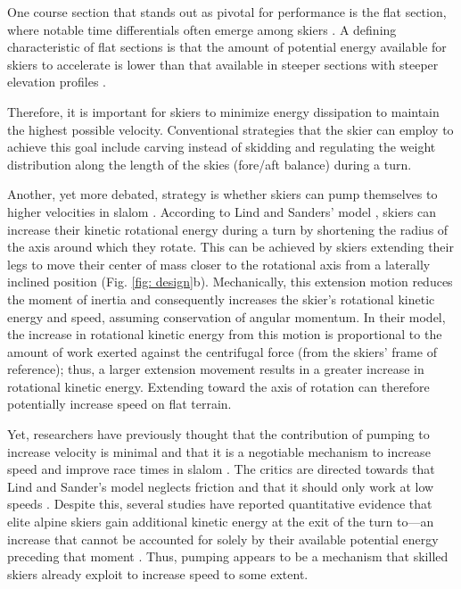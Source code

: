 \documentclass{article}
\begin{document}
One course section that stands out as pivotal for performance is the flat section\cite{supej_new_2011, supej_relations_2006}, where notable time differentials often emerge among skiers \cite{supej_impact_2015}. A defining characteristic of flat sections is that the amount of potential energy available for skiers to accelerate is lower than that available in steeper sections with steeper elevation profiles \cite{supej_differential_2008}. 

Therefore, it is important for skiers to minimize energy dissipation to maintain the highest possible velocity. Conventional strategies that the skier can employ to achieve this goal include carving instead of skidding and regulating the weight distribution along the length of the skies (fore/aft balance) during a turn\cite{reid_turn_2009, reid_kinematic_2010,supej_impact_2015, supej_differential_2008}.

Another, yet more debated, strategy is whether skiers can pump themselves to higher velocities in slalom \cite{lind_physics_2013, luginbuhl_identification_2023, mote_accelerations_1983}. According to Lind and Sanders' model \cite{lind_physics_2013}, skiers can increase their kinetic rotational energy during a turn by shortening the radius of the axis around which they rotate. This can be achieved by skiers extending their legs to move their center of mass closer to the rotational axis from a laterally inclined position (Fig. \ref{fig: design}b). Mechanically, this extension motion reduces the moment of inertia and consequently increases the skier's rotational kinetic energy and speed, assuming conservation of angular momentum. In their model, the increase in rotational kinetic energy from this motion is proportional to the amount of work exerted against the centrifugal force (from the skiers' frame of reference); thus, a larger extension movement results in a greater increase in rotational kinetic energy. Extending toward the axis of rotation can therefore potentially increase speed on flat terrain.

Yet, researchers have previously thought that the contribution of pumping to increase velocity is minimal and that it is a negotiable mechanism to increase speed and improve race times in slalom \cite{supej_differential_2008, supej_doba_2001}. The critics are directed towards that Lind and Sander's model neglects friction and that it should only work at low speeds \cite{supej_differential_2008, supej_how_2010}. Despite this, several studies have reported quantitative evidence that elite alpine skiers gain additional kinetic energy at the exit of the turn to—an increase that cannot be accounted for solely by their available potential energy preceding that moment \cite{reid_kinematic_2010, supej_differential_2008, supej_how_2010, supej_impact_2015}. Thus, pumping appears to be a mechanism that skilled skiers already exploit to increase speed to some extent. 
\end{document}
